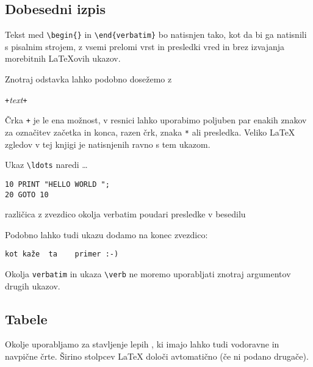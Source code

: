 \subsection{Dobesedni izpis}

Tekst med \verb|\begin{|\verb|}| in
\verb|\end{verbatim}| bo natisnjen tako, kot da bi ga natisnili s pisalnim strojem,
z vsemi prelomi vrst in presledki vred in brez izvajanja morebitnih \LaTeX{}ovih ukazov.

Znotraj odstavka lahko podobno dosežemo z 
\begin{lscommand}
\verb|+|\emph{text}\verb|+|
\end{lscommand}
\noindent Črka \verb|+| je le ena možnost, v resnici lahko uporabimo poljuben par enakih znakov za označitev začetka in konca,
razen črk, znaka \verb|*| ali presledka. Veliko \LaTeX{} zgledov v tej knjigi 
je natisnjenih ravno s tem ukazom.

\begin{example}
Ukaz \verb|\ldots| naredi \ldots

\begin{verbatim}
10 PRINT "HELLO WORLD ";
20 GOTO 10
\end{verbatim}
\end{example}

\begin{example}
\begin{verbatim*}
različica z zvezdico
okolja     verbatim   
poudari   presledke
v besedilu
\end{verbatim*}
\end{example}

Podobno lahko tudi ukazu  dodamo na konec zvezdico:

\begin{example}
\verb*|kot kaže  ta    primer :-) |
\end{example}

Okolja \texttt{verbatim} in ukaza \verb|\verb| ne moremo uporabljati znotraj
argumentov drugih ukazov.

\subsection{Tabele}

\newcommand{\mfr}[1]{\framebox{\rule{0pt}{0.7em}\texttt{#1}}}

Okolje  uporabljamo za stavljenje lepih ,
ki imajo lahko tudi vodoravne in navpične črte. Širino stolpcev \LaTeX{}
določi avtomatično (če ni podano drugače).

